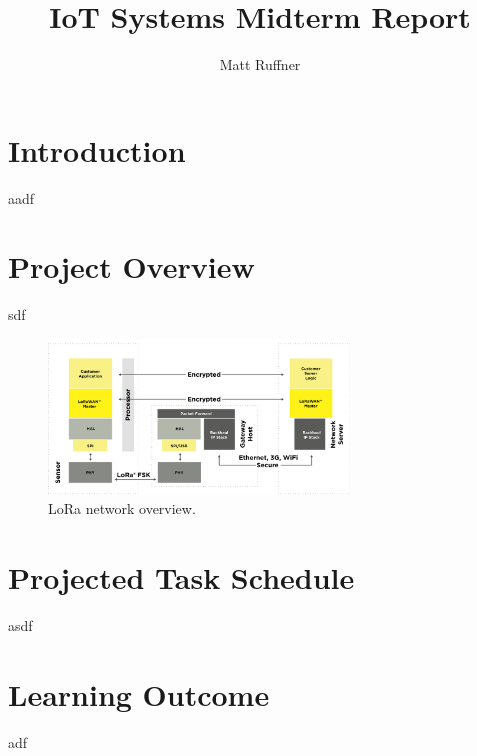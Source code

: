 \documentclass{IEEEtran}
\title{IoT Systems Midterm Report}
\author{Matt Ruffner}
\date{}
\begin{document}
\maketitle


\section{Introduction}
aadf

\section{Project Overview} 
sdf

\begin{figure}[h!]
    \centering
    \includegraphics[width=8cm]{images/lorasystem}
    \caption{LoRa network overview.}
    \label{fig:lora_overview}
\end{figure}
\section{Projected Task Schedule} 
asdf

\section{Learning Outcome}
adf



\end{document}
